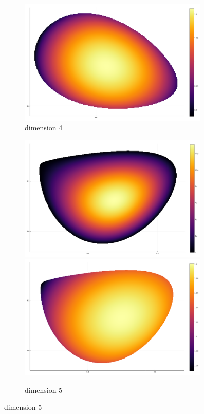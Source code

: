 \documentclass[10pt,a4paper]{report}
\theoremstyle{plain}
\theoremstyle{definition}
\theoremstyle{remark}
\begin{document}
\begin{figure}
\begin{subfigure}[t]{0.49\textwidth}
    \includegraphics[width=0.99\textwidth]{ent4.png}

    \caption{dimension 4}
  \end{subfigure}
  \begin{subfigure}[t]{0.49\textwidth}
    \includegraphics[width=0.99\textwidth]{det5.png}
    \includegraphics[width=0.99\textwidth]{ent5.png}
    \caption{dimension 5}
  \end{subfigure}


\end{figure}
\end{document}
